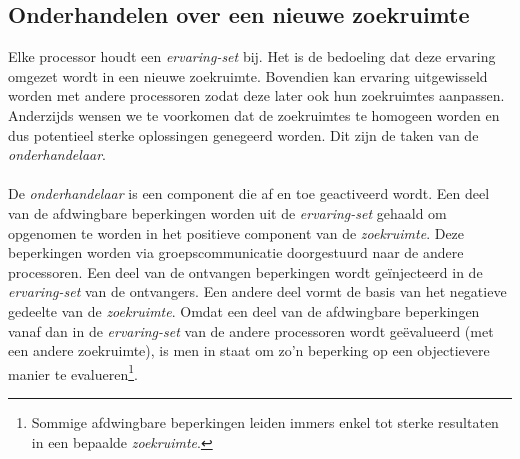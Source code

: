 \subsection{Onderhandelen over een nieuwe zoekruimte}

Elke processor houdt een \emph{ervaring-set} bij. Het is de bedoeling dat deze ervaring omgezet wordt in een nieuwe zoekruimte. Bovendien kan ervaring uitgewisseld worden met andere processoren zodat deze later ook hun zoekruimtes aanpassen. Anderzijds wensen we te voorkomen dat de zoekruimtes te homogeen worden en dus potentieel sterke oplossingen genegeerd worden. Dit zijn de taken van de \emph{onderhandelaar}.

\paragraph{}
De \emph{onderhandelaar} is een component die af en toe geactiveerd wordt. Een deel van de afdwingbare beperkingen worden uit de \emph{ervaring-set} gehaald om opgenomen te worden in het positieve component van de \emph{zoekruimte}. Deze beperkingen worden via groepscommunicatie doorgestuurd naar de andere processoren. Een deel van de ontvangen beperkingen wordt ge\"injecteerd in de \emph{ervaring-set} van de ontvangers. Een andere deel vormt de basis van het negatieve gedeelte van de \emph{zoekruimte}. Omdat een deel van de afdwingbare beperkingen vanaf dan in de \emph{ervaring-set} van de andere processoren wordt ge\"evalueerd (met een andere zoekruimte), is men in staat om zo'n beperking op een objectievere manier te evalueren\footnote{Sommige afdwingbare beperkingen leiden immers enkel tot sterke resultaten in een bepaalde \emph{zoekruimte}.}.